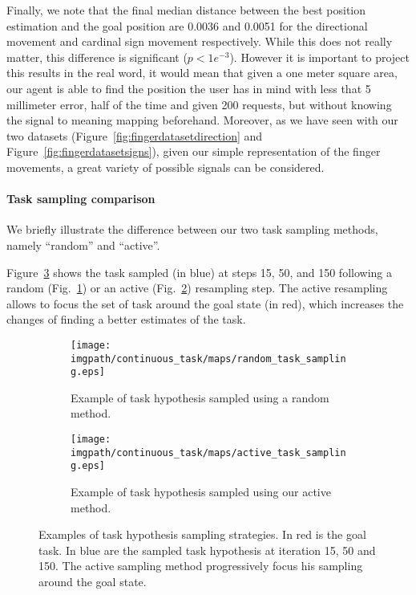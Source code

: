 Finally, we note that the final median distance between the best position estimation and the goal position are 0.0036 and 0.0051 for the directional movement and cardinal sign movement respectively. While this does not really matter, this difference is significant ($p< 1e^{-3}$). However it is important to project this results in the real word, it would mean that given a one meter square area, our agent is able to find the position the user has in mind with less that 5 millimeter error, half of the time and given 200 requests, but without knowing the signal to meaning mapping beforehand. Moreover, as we have seen with our two datasets (Figure~\ref{fig:fingerdatasetdirection} and Figure~\ref{fig:fingerdatasetsigns}), given our simple representation of the finger movements, a great variety of possible signals can be considered.

\paragraph{Task sampling comparison}

We briefly illustrate the difference between our two task sampling methods, namely ``random'' and ``active''.

Figure~\ref{fig:continuoustasktasksampling} shows the task sampled (in blue) at steps 15, 50, and 150 following a random (Fig.~\ref{fig:continuoustaskrandomtask}) or an active (Fig.~\ref{fig:continuoustaskactivetask}) resampling step. The active resampling allows to focus the set of task around the goal state (in red), which increases the changes of finding a better estimates of the task.

\begin{figure}[!htbp]
\centering
    \begin{subfigure}[b]{\columnwidth}
        \centering
        \texttt{[image: \\imgpath/continuous\_task/maps/random\_task\_sampling.eps]}
        \caption{Example of task hypothesis sampled using a random method.}
        \label{fig:continuoustaskrandomtask}
    \end{subfigure}
    \begin{subfigure}[b]{\columnwidth}
        \centering
        \texttt{[image: \\imgpath/continuous\_task/maps/active\_task\_sampling.eps]}
        \caption{Example of task hypothesis sampled using our active method.}
        \label{fig:continuoustaskactivetask}
    \end{subfigure}
\caption{Examples of task hypothesis sampling strategies. In red is the goal task. In blue are the sampled task hypothesis at iteration 15, 50 and 150. The active sampling method progressively focus his sampling around the goal state.}
\label{fig:continuoustasktasksampling}
\end{figure}

